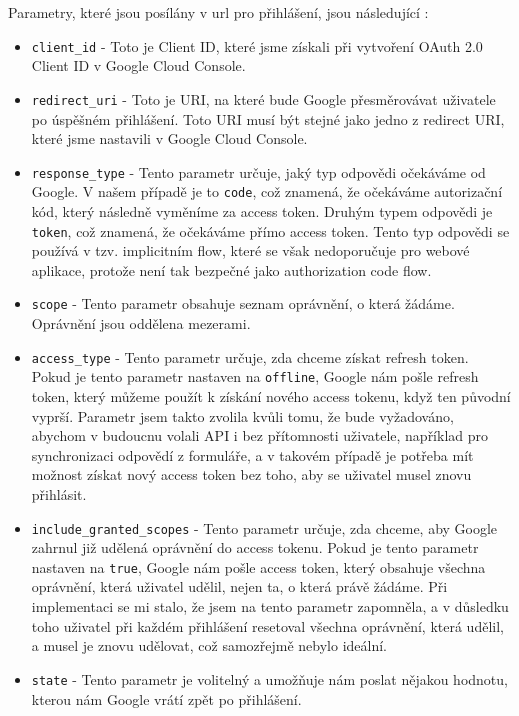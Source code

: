 Parametry, které jsou posílány v url pro přihlášení, jsou následující \cite{google_oauth_creating_client}:
\begin{itemize}
    \item \texttt{client\_id} - Toto je Client ID, které jsme získali při vytvoření OAuth 2.0 Client ID v Google Cloud Console.
    \item \texttt{redirect\_uri} - Toto je URI, na které bude Google přesměrovávat uživatele po úspěšném přihlášení. Toto URI musí být stejné jako jedno z redirect URI, které jsme nastavili v Google Cloud Console.
    \item \texttt{response\_type} - Tento parametr určuje, jaký typ odpovědi očekáváme od Google. V našem případě je to \texttt{code}, což znamená, že očekáváme autorizační kód, který následně vyměníme za access token. Druhým typem odpovědi je \texttt{token}, což znamená, že očekáváme přímo access token. Tento typ odpovědi se používá v tzv. implicitním flow, které se však nedoporučuje pro webové aplikace, protože není tak bezpečné jako authorization code flow.
    \item \texttt{scope} - Tento parametr obsahuje seznam oprávnění, o která žádáme. Oprávnění jsou oddělena mezerami.
    \item \texttt{access\_type} - Tento parametr určuje, zda chceme získat refresh token. Pokud je tento parametr nastaven na \texttt{offline}, Google nám pošle refresh token, který můžeme použít k získání nového access tokenu, když ten původní vyprší. Parametr jsem takto zvolila kvůli tomu, že bude vyžadováno, abychom v budoucnu volali API i bez přítomnosti uživatele, například pro synchronizaci odpovědí z formuláře, a v takovém případě je potřeba mít možnost získat nový access token bez toho, aby se uživatel musel znovu přihlásit.
    \item \texttt{include\_granted\_scopes} - Tento parametr určuje, zda chceme, aby Google zahrnul již udělená oprávnění do access tokenu. Pokud je tento parametr nastaven na \texttt{true}, Google nám pošle access token, který obsahuje všechna oprávnění, která uživatel udělil, nejen ta, o která právě žádáme. Při implementaci se mi stalo, že jsem na tento parametr zapomněla, a v důsledku toho uživatel při každém přihlášení resetoval všechna oprávnění, která udělil, a musel je znovu udělovat, což samozřejmě nebylo ideální.
    \item \texttt{state} - Tento parametr je volitelný a umožňuje nám poslat nějakou hodnotu, kterou nám Google vrátí zpět po přihlášení. 
\end{itemize}

